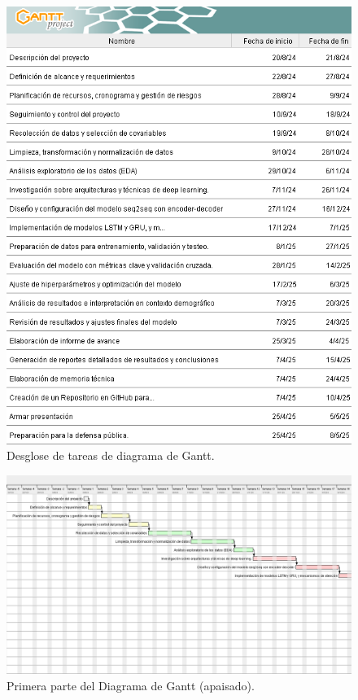 \documentclass[
11pt, %
]{charter}
\begin{document}
\begin{figure}[htpb]
	\vspace*{\fill} %
	\centering 
	\includegraphics[height=.7\textheight]{./Figuras/GDPgantttabla.png}
	\caption{Desglose de tareas de diagrama de Gantt.} %
	\label{fig:diagGantt1}
	\vspace*{\fill} %
\end{figure}


\begin{landscape}
	\vspace*{\fill} %
\begin{figure}[htpb]
\centering 
\includegraphics[height=.65\textheight]{./Figuras/GDPgantt11.png}
\caption{Primera parte del Diagrama de Gantt (apaisado).} %
\label{fig:diagGantt2}
\end{figure}
\vspace*{\fill} %
\end{landscape}
\end{document}
